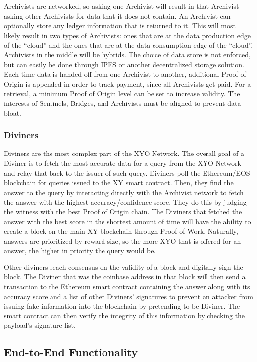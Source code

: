 \documentclass{article}
\begin{document}
Archivists are networked, so asking one Archivist will result in that Archivist asking other Archivists for data that it does not contain. An Archivist can optionally store any ledger information that is returned to it. This will most likely result in two types of Archivists: ones that are at the data production edge of the “cloud” and the ones that are at the data consumption edge of the “cloud”. Archivists in the middle will be hybrids. The choice of data store is not enforced, but can easily be done through IPFS or another decentralized storage solution. Each time data is handed off from one Archivist to another, additional Proof of Origin is appended in order to track payment, since all Archivists get paid. For a retrieval, a minimum Proof of Origin level can be set to increase validity. The interests of Sentinels, Bridges, and Archivists must be aligned to prevent data bloat.

\subsubsection{Diviners}

Diviners are the most complex part of the XYO Network. The overall goal of a Diviner is to fetch the most accurate data for a query from the XYO Network and relay that back to the issuer of such query. Diviners poll the Ethereum/EOS blockchain for queries issued to the XY smart contract. Then, they find the answer to the query by interacting directly with the Archivist network to fetch the answer with the highest accuracy/confidence score. They do this by judging the witness with the best Proof of Origin chain. The Diviners that fetched the answer with the best score in the shortest amount of time will have the ability to create a block on the main XY blockchain through Proof of Work. Naturally, answers are prioritized by reward size, so the more XYO that is offered for an answer, the higher in priority the query would be.

Other diviners reach consensus on the validity of a block and digitally sign the block. The Diviner that was the coinbase address in that block will then send a transaction to the Ethereum smart contract containing the answer along with its accuracy score and a list of other Diviners' signatures to prevent an attacker from issuing fake information into the blockchain by pretending to be Diviner. The smart contract can then verify the integrity of this information by checking the payload's signature list.


\subsection{End-to-End Functionality}
\end{document}

